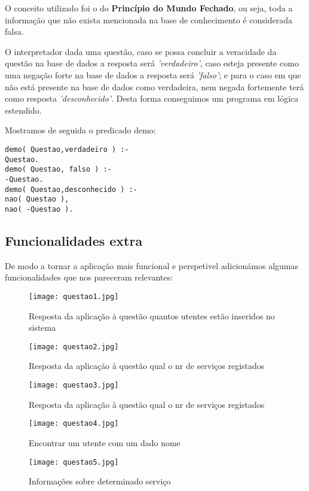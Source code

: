 O conceito utilizado foi o do \textbf{Princípio do Mundo Fechado}, ou seja, toda a informação que não exista mencionada na base de conhecimento é considerada falsa. 

O interpretador dada uma questão, caso se possa concluir a veracidade da questão na base de dados a resposta será \textit{'verdadeiro'}, caso esteja presente como uma negação forte na base de dados a resposta será \textit{'falso'}; e para o caso em que não está presente na base de dados como verdadeira, nem negada fortemente terá como resposta \textit{'desconhecido'}. Desta forma conseguimos um programa em lógica estendido. 

Mostramos de seguida o predicado demo: 
\begin{verbatim}
demo( Questao,verdadeiro ) :-
Questao.
demo( Questao, falso ) :-
-Questao.
demo( Questao,desconhecido ) :-
nao( Questao ),
nao( -Questao ).
\end{verbatim}

\subsection{Funcionalidades extra}
De modo a tornar a aplicação mais funcional e perspetivel adicionámos algumas funcionalidades que nos pareceram relevantes: 

\begin{figure}[<+htb+>]
	\centering
	\texttt{[image: questao1.jpg]}
	\caption{Resposta da aplicação à questão quantos utentes estão inseridos no sistema}
\end{figure}

\begin{figure}[<+htb+>]
	\centering
	\texttt{[image: questao2.jpg]}
	\caption{Resposta da aplicação à questão qual o nr de serviços registados}
\end{figure}

\begin{figure}[<+htb+>]
	\centering
	\texttt{[image: questao3.jpg]}
	\caption{Resposta da aplicação à questão qual o nr de serviços registados}
\end{figure}

\begin{figure}[<+ht+>]
	\centering
	\texttt{[image: questao4.jpg]}
	\caption{Encontrar um utente com um dado nome }
\end{figure}


\begin{figure}[<+ht+>]
	\centering
	\texttt{[image: questao5.jpg]}
	\caption{Informações sobre determinado serviço}
\end{figure}


